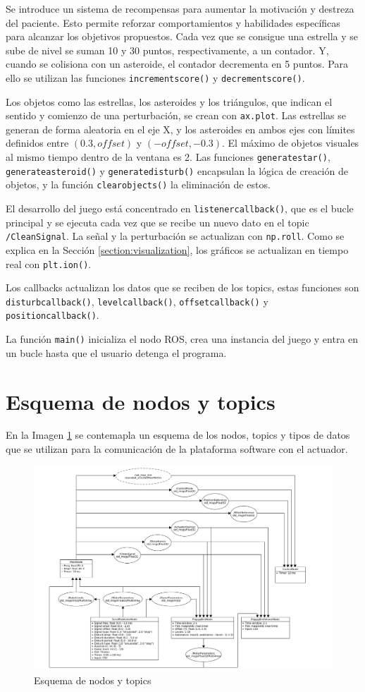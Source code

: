 Se introduce un sistema de recompensas para aumentar la motivación y destreza del paciente.
Esto permite reforzar comportamientos y habilidades específicas para alcanzar los objetivos propuestos.
Cada vez que se consigue una estrella y se sube de nivel se suman 10 y 30 puntos, respectivamente, a un contador.
Y, cuando se colisiona con un asteroide, el contador decrementa en 5 puntos.
Para ello se utilizan las funciones \verb|incrementscore()| y \verb|decrementscore()|.

Los objetos como las estrellas, los asteroides y los triángulos, que indican el sentido y comienzo de una perturbación, se crean con \verb|ax.plot|.
Las estrellas se generan de forma aleatoria en el eje X, y los asteroides en ambos ejes con límites definidos entre $(0.3, offset)$ y $(-offset, -0.3)$.
El máximo de objetos visuales al mismo tiempo dentro de la ventana es 2.
Las funciones \verb|generatestar()|, \verb|generateasteroid()| y \verb|generatedisturb()| encapsulan la lógica de creación de objetos, y la función \verb|clearobjects()| la eliminación de estos.

El desarrollo del juego está concentrado en \verb|listenercallback()|, que es el bucle principal y se ejecuta cada vez que se recibe un nuevo dato en el topic \verb|/CleanSignal|.
La señal y la perturbación se actualizan con \verb|np.roll|.
Como se explica en la Sección \ref{section:visualization}, los gráficos se actualizan en tiempo real con \verb|plt.ion()|.

Los callbacks actualizan los datos que se reciben de los topics, estas funciones son \verb|disturbcallback()|, \verb|levelcallback()|, \verb|offsetcallback()| y \verb|positioncallback()|.

La función \verb|main()| inicializa el nodo ROS, crea una instancia del juego y entra en un bucle hasta que el usuario detenga el programa.

\section{Esquema de nodos y topics}
\label{section:review}

En la Imagen \ref{fig:nodes} se contemapla un esquema de los nodos, topics y tipos de datos que se utilizan para la comunicación de la plataforma software con el actuador.

\begin{figure}[ht!]
	\centering
	\begin{minipage}{0.90\linewidth}
		\centering
		\includegraphics[width=\linewidth]{figs/esquema_nodos.png}
	\end{minipage}
	\caption[Esquema de nodos y topics]{Esquema de nodos y topics}
	\label{fig:nodes}
\end{figure}
